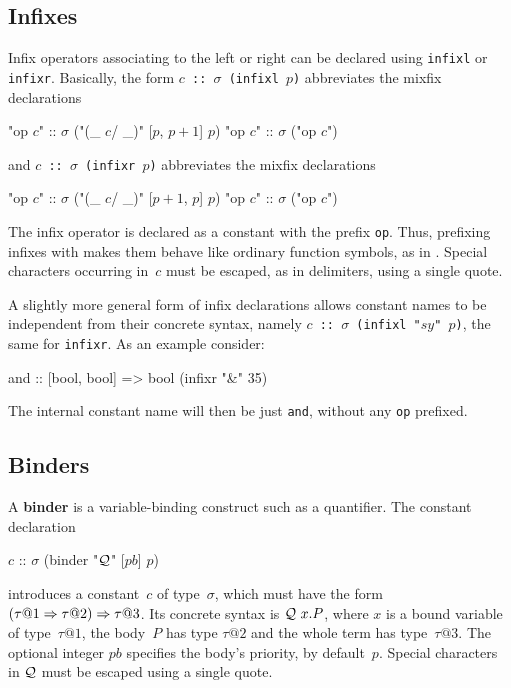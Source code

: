

\subsection{Infixes}

Infix operators associating to the left or right can be declared using
{\tt infixl} or {\tt infixr}.  Basically, the form {\tt $c$ ::\ 
  $\sigma$ (infixl $p$)} abbreviates the mixfix declarations
\begin{ttbox}
"op \(c\)" :: \(\sigma\)   ("(_ \(c\)/ _)" [\(p\), \(p+1\)] \(p\))
"op \(c\)" :: \(\sigma\)   ("op \(c\)")
\end{ttbox}
and {\tt $c$ ::\ $\sigma$ (infixr $p$)} abbreviates the mixfix declarations
\begin{ttbox}
"op \(c\)" :: \(\sigma\)   ("(_ \(c\)/ _)" [\(p+1\), \(p\)] \(p\))
"op \(c\)" :: \(\sigma\)   ("op \(c\)")
\end{ttbox}
The infix operator is declared as a constant with the prefix {\tt op}.
Thus, prefixing infixes with \sdx{op} makes them behave like ordinary
function symbols, as in \ML.  Special characters occurring in~$c$ must be
escaped, as in delimiters, using a single quote.

A slightly more general form of infix declarations allows constant
names to be independent from their concrete syntax, namely \texttt{$c$
  ::\ $\sigma$\ (infixl "$sy$" $p$)}, the same for \texttt{infixr}.  As
an example consider:
\begin{ttbox}
and :: [bool, bool] => bool  (infixr "&" 35)
\end{ttbox}
The internal constant name will then be just \texttt{and}, without any
\texttt{op} prefixed.


\subsection{Binders}
\begingroup
\def\Q{{\cal Q}}
A {\bf binder} is a variable-binding construct such as a quantifier.  The
constant declaration
\begin{ttbox}
\(c\) :: \(\sigma\)   (binder "\(\Q\)" [\(pb\)] \(p\))
\end{ttbox}
introduces a constant~$c$ of type~$\sigma$, which must have the form
$(\tau@1 \To \tau@2) \To \tau@3$.  Its concrete syntax is $\Q~x.P$, where
$x$ is a bound variable of type~$\tau@1$, the body~$P$ has type $\tau@2$
and the whole term has type~$\tau@3$.  The optional integer $pb$
specifies the body's priority, by default~$p$.  Special characters
in $\Q$ must be escaped using a single quote.

